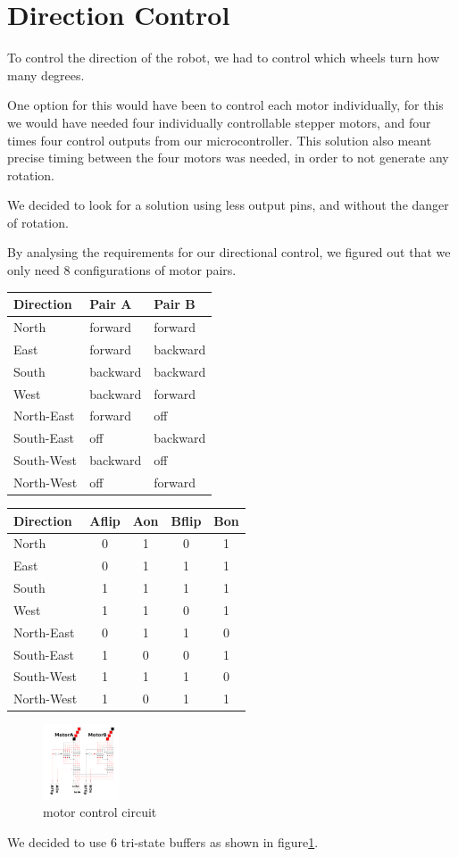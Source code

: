\section{Direction Control}\label{sec:direction}
To control the direction of the robot,
we had to control which wheels turn how many degrees.

One option for this would have been to control each motor individually,
for this we would have needed four individually controllable stepper motors,
and four times four control outputs from our microcontroller.
This solution also meant precise timing between the four motors was needed,
in order to not generate any rotation.

We decided to look for a solution using less output pins,
and without the danger of rotation.

By analysing the requirements for our directional control,
we figured out that we only need 8 configurations of motor pairs.
\begin{center}
\begin{tabular}{|l|l|l|}
	\hline
	Direction & Pair A & Pair B	\\
	\hline
	North & forward & forward \\
	East 	& forward & backward \\
	South & backward & backward \\
	West 	& backward & forward \\
	\hline
	North-East & forward & off \\
	South-East & off & backward \\
	South-West & backward & off\\
	North-West & off & forward \\
	\hline
\end{tabular}
\begin{tabular}{|l|c|c|c|c|}
	\hline
	Direction & Aflip & Aon & Bflip & Bon \\
	\hline
	North & 0 & 1 & 0 & 1 \\
	East 	& 0 & 1 & 1 & 1 \\
	South & 1 & 1 & 1 & 1 \\
	West 	& 1 & 1 & 0 & 1 \\
	\hline
	North-East & 0 & 1 & 1 & 0 \\
	South-East & 1 & 0 & 0 & 1 \\
	South-West & 1 & 1 & 1 & 0 \\
	North-West & 1 & 0 & 1 & 1 \\
	\hline
\end{tabular}
\end{center}
\begin{figure}[htp]
	\centering
	\includegraphics[width=0.2\textwidth]{figures/move/direction_choice}
	\caption{motor control circuit}
	\label{fig:mot_ctrl}
\end{figure}

We decided to use 6 tri-state buffers as shown in figure\ref{fig:mot_ctrl}.
